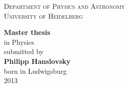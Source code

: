 \title{\mytitle}
\date{\today}


\thispagestyle{empty}
\begin{center}
    \renewcommand{\baselinestretch}{2.00}
    \Large%
    \textsc{Department of Physics and Astronomy}\\
    \large \textsc{University of Heidelberg}
    \par\vfill\normalfont
    
    \textbf{Master thesis}\\
    in Physics\\\vspace{2.5em}
    submitted by\\
    \textbf{Philipp Hanslovsky}\\
    born in Ludwigsburg\\\vspace{3em}
    2013
\end{center}
    \clearpage


